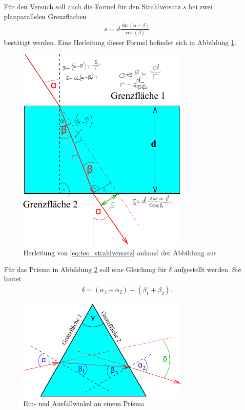 Für den Versuch soll auch die Formel für den Strahlversatz $s$ bei zwei planparallelen Grenzflächen
\begin{align}
    s = d \frac{\sin(\alpha - \beta)}{\cos(\beta)}
    \label{eq:teo_strahlversatz}
\end{align}
bestätigt werden.
Eine Herleitung dieser Formel befindet sich in Abbildung \ref{fig:strahlversatz}.
\begin{figure}
    \centering
    \includegraphics{Abbildungen/v400_strahlversatz.pdf}
    \caption{Herleitung von \eqref{eq:teo_strahlversatz} anhand der Abbildung aus \cite{man:v400}}
    \label{fig:strahlversatz}
\end{figure}

Für das Prisma in Abbildung \ref{fig:prisma} soll eine Gleichung für $\delta$ aufgestellt werden.
Sie lautet
\begin{align}
    \delta = (\alpha_1 + \alpha_2) - (\beta_1 + \beta_2). %
    \label{eq:prisma}
\end{align}

\begin{figure}
    \centering
    \includegraphics{11_v400/Abbildungen/Prisma.pdf}
    \caption{Ein- und Ausfallwinkel an einem Prisma}
    \label{fig:prisma}
\end{figure}

